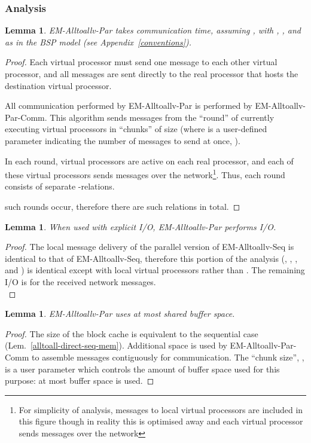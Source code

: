 \documentclass[12pt]{carletoncsthesis}
\newtheorem{lemma}[thm]{Lemma}
\begin{document}
\subsubsection{Analysis}


\begin{lemma}
\label{em-alltoall-comm}
{\sc EM-Alltoallv-Par} takes 
communication time, assuming , with , , and  as in
the BSP model (see Appendix~\ref{conventions}).
\end{lemma}
\begin{proof}
Each virtual processor must send one message to each other virtual processor,
and all messages are sent directly to the real processor that hosts the
destination virtual processor.

All communication performed by {\sc EM-Alltoallv-Par} is performed by {\sc
EM-Alltoallv-Par-Comm}.  This algorithm sends messages from the ``round''
of  currently executing virtual processors in ``chunks'' of size 
(where  is a user-defined parameter indicating the number of messages
to send at once, ).

In each round,  virtual processors are active on each real processor,
and each of these virtual processors sends  messages over the
network\footnote{For simplicity of analysis, messages to local virtual
processors are included in this figure though in reality this is optimised
away and each virtual processor sends  messages over
the network}.  Thus, each round consists of  separate
-relations.

 such rounds occur, therefore there are 
such relations in total.
\end{proof}

\begin{lemma}
\label{alltoall-direct-par-io}
When used with explicit I/O, {\sc EM-Alltoallv-Par} performs
 I/O.
\end{lemma}
\begin{proof}
The local message delivery of the parallel version of {\sc EM-Alltoallv-Seq}
is identical to that of {\sc EM-Alltoallv-Seq}, therefore this portion of
the analysis (,  , , and ) is identical
except with  local virtual processors rather than .  The remaining
I/O is  for the received network messages.
\\

\end{proof}

\begin{lemma}
\label{alltoall-direct-par-mem}
{\sc EM-Alltoallv-Par} uses at most  shared buffer space.
\end{lemma}
\begin{proof}
The size of the block cache is equivalent to the sequential case
(Lem.~\ref{alltoall-direct-seq-mem}).  Additional space is used by {\sc
EM-Alltoallv-Par-Comm} to assemble messages contiguously for communication.
The ``chunk size'', , is a user parameter which controls the amount
of buffer space used for this purpose: at most  buffer
space is used.
\end{proof}
\end{document}
